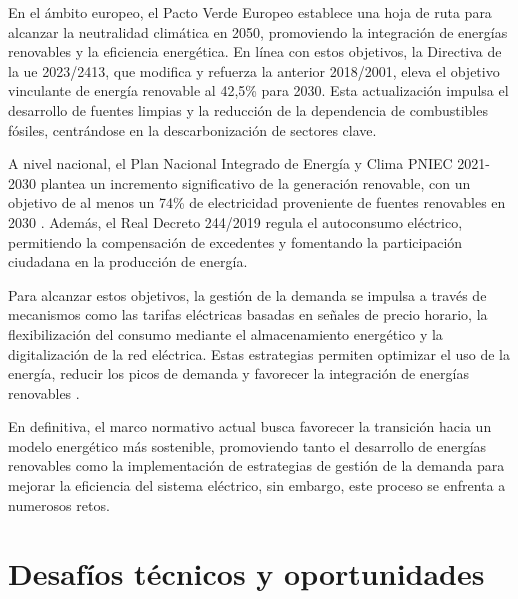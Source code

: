 \documentclass[11pt,a4paper]{book}
\begin{document}
En el ámbito europeo, el Pacto Verde Europeo establece una hoja de ruta para alcanzar la neutralidad climática en 2050, promoviendo la integración de energías renovables y la eficiencia energética. En línea con estos objetivos, la Directiva de la \gls{ue} 2023/2413, que modifica y refuerza la anterior 2018/2001, eleva el objetivo vinculante de energía renovable al 42,5\% para 2030. Esta actualización impulsa el desarrollo de fuentes limpias y la reducción de la dependencia de combustibles fósiles, centrándose en la descarbonización de sectores clave.

A nivel nacional, el Plan Nacional Integrado de Energía y Clima \gls{PNIEC} 2021-2030 plantea un incremento significativo de la generación renovable, con un objetivo de al menos un 74\% de electricidad proveniente de fuentes renovables en 2030 \cite{pniec2021}. Además, el Real Decreto 244/2019 regula el autoconsumo eléctrico, permitiendo la compensación de excedentes y fomentando la participación ciudadana en la producción de energía.

Para alcanzar estos objetivos, la gestión de la demanda se impulsa a través de mecanismos como las tarifas eléctricas basadas en señales de precio horario, la flexibilización del consumo mediante el almacenamiento energético y la digitalización de la red eléctrica. Estas estrategias permiten optimizar el uso de la energía, reducir los picos de demanda y favorecer la integración de energías renovables \cite{gestionDemanda2022}.

En definitiva, el marco normativo actual busca favorecer la transición hacia un modelo energético más sostenible, promoviendo tanto el desarrollo de energías renovables como la implementación de estrategias de gestión de la demanda para mejorar la eficiencia del sistema eléctrico, sin embargo, este proceso se enfrenta a numerosos retos.

\section{Desafíos técnicos y oportunidades}
\end{document}
